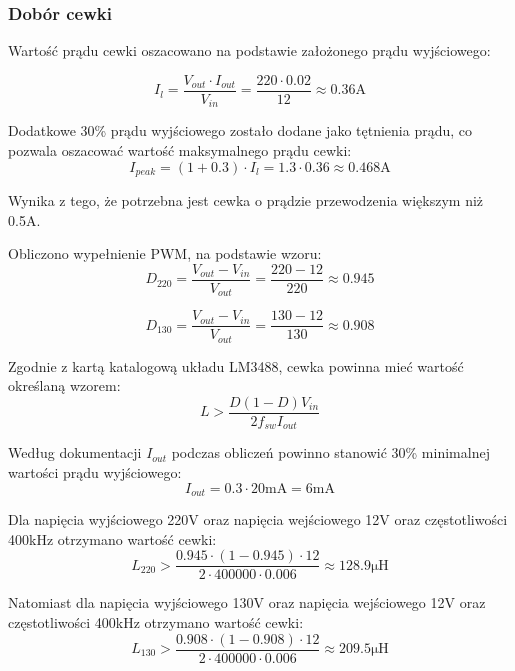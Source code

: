 \documentclass[../../main.tex]{subfiles}
\begin{document}
\subsubsection{Dobór cewki}
Wartość prądu cewki oszacowano na podstawie założonego prądu wyjściowego:

\begin{equation}
    I_{l} = \frac{V_{out} \cdot I_{out}}{V_{in}} = \frac{220 \cdot 0.02}{12} \approx 0.36\si{\ampere}
\end{equation}

Dodatkowe 30\% prądu wyjściowego zostało dodane jako tętnienia prądu, co pozwala oszacować wartość maksymalnego prądu cewki:
\begin{equation}
    I_{peak} = (1+0.3) \cdot I_{l} = 1.3 \cdot 0.36 \approx 0.468\si{\ampere}
\end{equation}

Wynika z tego, że potrzebna jest cewka o prądzie przewodzenia większym niż 0.5\si{\ampere}.

Obliczono wypełnienie PWM, na podstawie wzoru:
\begin{equation}
    D_{220} = \frac{V_{out}-V_{in}}{V_{out}} = \frac{220-12}{220} \approx 0.945
\end{equation}

\begin{equation}
    D_{130} = \frac{V_{out}-V_{in}}{V_{out}} = \frac{130-12}{130} \approx 0.908
\end{equation}

Zgodnie z kartą katalogową układu LM3488, cewka powinna mieć wartość określaną wzorem:
\begin{equation}
    L > \frac{D(1-D)V_{in}}{2f_{sw}I_{out}}
\end{equation}

Według dokumentacji $I_{out}$ podczas obliczeń powinno stanowić 30\% minimalnej wartości prądu wyjściowego:
\begin{equation}
    I_{out} = 0.3 \cdot 20\si{\milli\ampere} = 6\si{\milli\ampere}
\end{equation}

Dla napięcia wyjściowego 220\si{\volt} oraz napięcia wejściowego 12\si{\volt} oraz częstotliwości 400\si{\kilo\hertz} otrzymano wartość cewki:
\begin{equation}
    L_{220} > \frac{0.945 \cdot (1-0.945) \cdot 12}{2 \cdot 400000 \cdot 0.006} \approx 128.9\si{\micro\henry}
\end{equation}

Natomiast dla napięcia wyjściowego 130\si{\volt} oraz napięcia wejściowego 12\si{\volt} oraz częstotliwości 400\si{\kilo\hertz} otrzymano wartość cewki:
\begin{equation}
    L_{130} > \frac{0.908 \cdot (1-0.908) \cdot 12}{2 \cdot 400000 \cdot 0.006} \approx 209.5\si{\micro\henry}
\end{equation}
\end{document}
